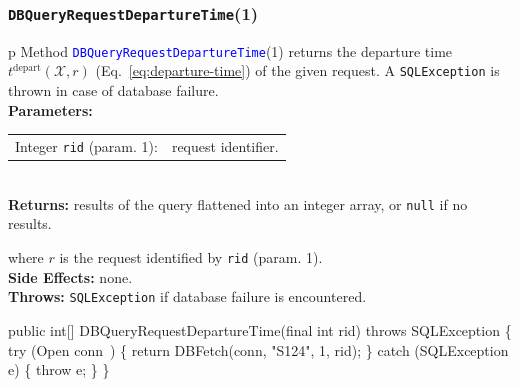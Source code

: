 \documentclass{article}
\def\nwendcode{\endtrivlist \endgroup}      %
\let\nwdocspar=\par
\theoremstyle{definition}                   %
\begin{document}
\subsubsection{{\tt{}\protect{}DBQueryRequestDepartureTime}(1)}
\begin{tabular}{p{\textwidth}}
\toprule
{}
Method \textcolor{blue}{{\tt{}\protect{}DBQueryRequestDepartureTime}}(1) returns the
departure time $t^\textrm{depart}(\mathcal{X},r)$
(Eq.~\ref{eq:departure-time}) of the given request.
A {\tt{}SQLException} is thrown in case of database failure.\\
\midrule
\textbf{Parameters:}\\
\begin{tabular}{lp{116mm}}
Integer {\tt{}rid} (param. 1):&request identifier.
\end{tabular}\\
\textbf{Returns:} results of the query flattened into an integer array,
or {\tt{}null} if no results.


where $r$ is the request identified by {\tt{}rid} (param. 1).\\
\textbf{Side Effects:} none.\\
\textbf{Throws:} {\tt{}SQLException} if database failure is encountered.\\
\bottomrule
\end{tabular}
\nwenddocs{}\plusendmoddef
public int[] DBQueryRequestDepartureTime(final int rid) throws SQLException \{
  try (\LA{}Open \code{}conn\edoc{}~{\nwtagstyle{}}\RA{}) \{
    return DBFetch(conn, "S124", 1, rid);
  \} catch (SQLException e) \{
    throw e;
  \}
\}
\eatline
{}\nwendcode{}\nwdocspar
\end{document}
